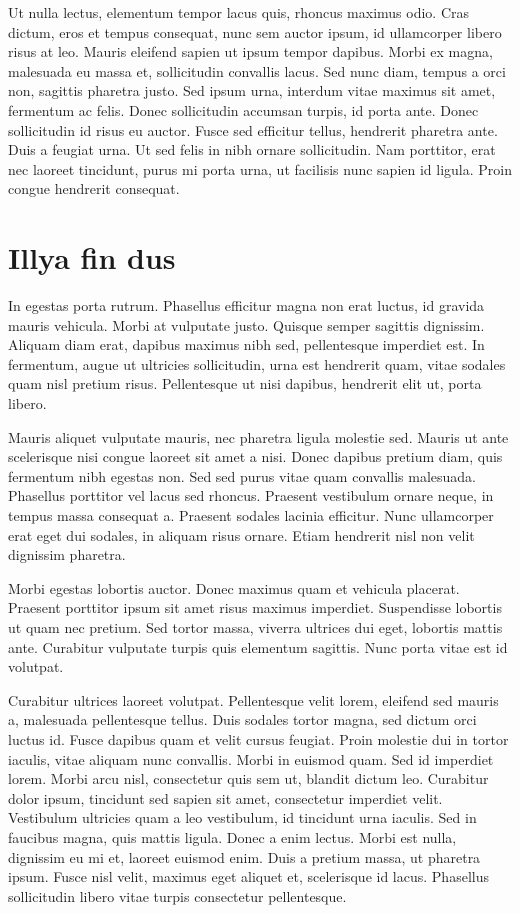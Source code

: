 Ut nulla lectus, elementum tempor lacus quis, rhoncus maximus odio. 
Cras dictum, eros et tempus consequat, nunc sem auctor ipsum, id ullamcorper libero risus at leo. 
Mauris eleifend sapien ut ipsum tempor dapibus. 
Morbi ex magna, malesuada eu massa et, sollicitudin convallis lacus. 
Sed nunc diam, tempus a orci non, sagittis pharetra justo. 
Sed ipsum urna, interdum vitae maximus sit amet, fermentum ac felis. 
Donec sollicitudin accumsan turpis, id porta ante. 
Donec sollicitudin id risus eu auctor. 
Fusce sed efficitur tellus, hendrerit pharetra ante. 
Duis a feugiat urna. 
Ut sed felis in nibh ornare sollicitudin. 
Nam porttitor, erat nec laoreet tincidunt, purus mi porta urna, ut facilisis nunc sapien id ligula. 
Proin congue hendrerit consequat.

\section{Illya fin dus}
In egestas porta rutrum. 
Phasellus efficitur magna non erat luctus, id gravida mauris vehicula. 
Morbi at vulputate justo. 
Quisque semper sagittis dignissim. 
Aliquam diam erat, dapibus maximus nibh sed, pellentesque imperdiet est. 
In fermentum, augue ut ultricies sollicitudin, urna est hendrerit quam, vitae sodales quam nisl pretium risus. 
Pellentesque ut nisi dapibus, hendrerit elit ut, porta libero.

Mauris aliquet vulputate mauris, nec pharetra ligula molestie sed. 
Mauris ut ante scelerisque nisi congue laoreet sit amet a nisi. 
Donec dapibus pretium diam, quis fermentum nibh egestas non. 
Sed sed purus vitae quam convallis malesuada. 
Phasellus porttitor vel lacus sed rhoncus. 
Praesent vestibulum ornare neque, in tempus massa consequat a. 
Praesent sodales lacinia efficitur. 
Nunc ullamcorper erat eget dui sodales, in aliquam risus ornare. 
Etiam hendrerit nisl non velit dignissim pharetra.

Morbi egestas lobortis auctor. 
Donec maximus quam et vehicula placerat. 
Praesent porttitor ipsum sit amet risus maximus imperdiet. 
Suspendisse lobortis ut quam nec pretium. 
Sed tortor massa, viverra ultrices dui eget, lobortis mattis ante. 
Curabitur vulputate turpis quis elementum sagittis. 
Nunc porta vitae est id volutpat.

Curabitur ultrices laoreet volutpat. 
Pellentesque velit lorem, eleifend sed mauris a, malesuada pellentesque tellus. 
Duis sodales tortor magna, sed dictum orci luctus id. 
Fusce dapibus quam et velit cursus feugiat. 
Proin molestie dui in tortor iaculis, vitae aliquam nunc convallis. 
Morbi in euismod quam. 
Sed id imperdiet lorem. 
Morbi arcu nisl, consectetur quis sem ut, blandit dictum leo. 
Curabitur dolor ipsum, tincidunt sed sapien sit amet, consectetur imperdiet velit. 
Vestibulum ultricies quam a leo vestibulum, id tincidunt urna iaculis. 
Sed in faucibus magna, quis mattis ligula. 
Donec a enim lectus. 
Morbi est nulla, dignissim eu mi et, laoreet euismod enim. 
Duis a pretium massa, ut pharetra ipsum. 
Fusce nisl velit, maximus eget aliquet et, scelerisque id lacus. 
Phasellus sollicitudin libero vitae turpis consectetur pellentesque.

